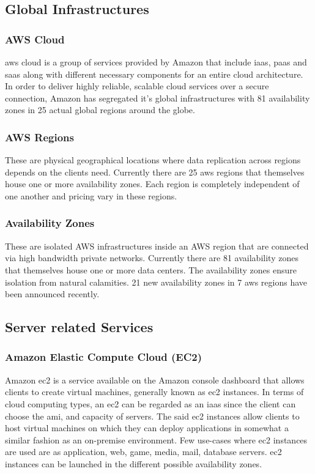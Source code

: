 \documentclass{home_assignment}
\begin{document}
    \subsection{Global Infrastructures}
    \subsubsection{AWS Cloud}
    \acrshort{aws} cloud is a group of services provided by Amazon that include \acrshort{iaas}, \acrshort{paas} and \acrshort{saas} along with different necessary components for an entire cloud architecture. In order to deliver highly reliable, scalable cloud services over a secure connection, Amazon has segregated it's global infrastructures with 81 availability zones in 25 actual global regions around the globe.
    \subsubsection{AWS Regions}
    These are physical geographical locations where data replication across regions depends on the clients need. Currently there are 25 \acrshort{aws} regions that themselves house one or more availability zones. Each region is completely independent of one another and pricing vary in these regions.
    \subsubsection{Availability Zones}
    These are isolated AWS infrastructures inside an AWS region that are connected via high bandwidth private networks. Currently there are 81 availability zones that themselves house one or more data centers. The availability zones ensure isolation from natural calamities. 21 new availability zones in 7 \acrshort{aws} regions have been announced recently.

    \subsection{Server related Services}
\subsubsection{Amazon Elastic Compute Cloud (EC2)} 
Amazon \acrfull{ec2} is a service available on the Amazon console dashboard that allows clients to create virtual machines, generally known as \acrshort{ec2} instances. In terms of cloud computing types, an \acrshort{ec2} can be regarded as an \acrshort{iaas} since the client can choose the \acrshort{ami}, and capacity of servers. The said \acrshort{ec2} instances allow clients to host virtual machines on which they can deploy applications in somewhat a similar fashion as an on-premise environment. Few use-cases where \acrshort{ec2} instances are used are as application, web, game, media, mail, database servers. \acrshort{ec2} instances can be launched in the different possible availability zones. 
\end{document}
